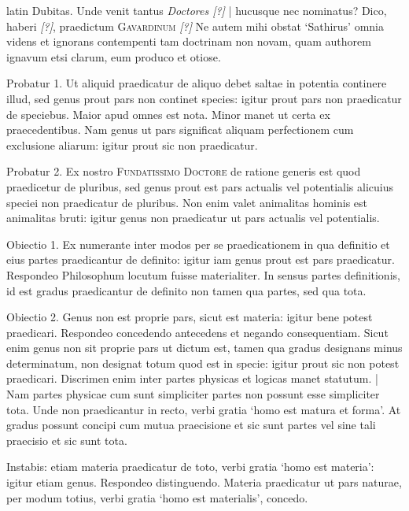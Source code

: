 \begin{otherlanguage*}{latin}
\pstart
Dubitas. Unde venit tantus \emph{Doctores [?]} \textnormal{|} hucusque nec nominatus? Dico, haberi  \emph{ [?]}, praedictum \textsc{Gavardinum} \emph{ [?]} Ne autem mihi obstat `Sathirus' omnia videns et ignorans contempenti tam doctrinam non novam, quam authorem ignavum etsi clarum, eum produco et otiose. 
\pend

\pstart
Probatur 1. Ut aliquid praedicatur de aliquo debet saltae in potentia continere illud, sed genus prout pars non continet species:
igitur prout pars non praedicatur de speciebus. Maior apud omnes est nota. Minor manet ut certa ex praecedentibus. Nam genus ut pars significat aliquam perfectionem cum exclusione aliarum:
igitur prout sic non praedicatur. 
\pend

\pstart
Probatur 2. Ex nostro \textsc{Fundatissimo Doctore} de ratione generis est quod praedicetur de pluribus, sed genus prout est pars actualis vel potentialis alicuius speciei non praedicatur de pluribus. Non enim valet animalitas hominis est animalitas bruti:
igitur genus non praedicatur ut pars actualis vel potentialis. 
\pend

\pstart
Obiectio 1. Ex  numerante inter modos per se praedicationem in qua definitio et eius partes praedicantur de definito:
igitur iam genus prout est pars praedicatur. Respondeo Philosophum locutum fuisse materialiter. In sensus partes definitionis, id est gradus praedicantur de definito non tamen qua partes, sed qua tota. 
\pend

\pstart
Obiectio 2. Genus non est proprie pars, sicut est materia:
igitur bene potest praedicari. Respondeo concedendo antecedens et negando consequentiam. Sicut enim genus non sit proprie pars ut dictum est, tamen qua gradus designans minus determinatum, non designat totum quod est in specie:
igitur prout sic non potest praedicari. Discrimen enim inter partes physicas et logicas manet statutum. \textnormal{|} Nam partes physicae cum sunt simpliciter partes non possunt esse simpliciter tota. Unde non praedicantur in recto, verbi gratia `homo est matura et forma'. At gradus possunt concipi cum mutua praecisione et sic sunt partes vel sine tali praecisio et sic sunt tota. 
\pend

\pstart
Instabis:
etiam materia praedicatur de toto, verbi gratia `homo est materia':
igitur etiam genus. Respondeo distinguendo. Materia praedicatur ut pars naturae, per modum totius, verbi gratia `homo est materialis', concedo. 
\pend


\end{otherlanguage*}
